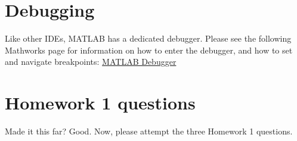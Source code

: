 \documentclass{article}
\begin{document}
\section{Debugging}
\label{sec:debugger}

Like other IDEs, MATLAB has a dedicated debugger. Please see the following Mathworks page for information on how to enter the debugger, and how to set and navigate breakpoints:
\href{https://www.mathworks.com/help/matlab/matlab_prog/debugging-process-and-features.html}{MATLAB Debugger}

\section{Homework 1 questions}
Made it this far? Good. Now, please attempt the three Homework 1 questions.
\end{document}
